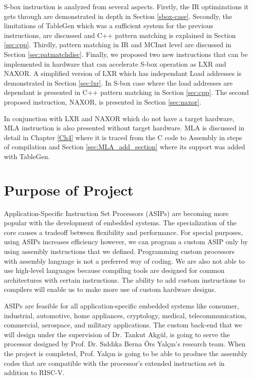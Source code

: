 S-box instruction is analyzed from several aspects. Firstly, the IR optimizations it gets through are demonstrated in depth in Section \ref{sbox-case}. Secondly, the limitations of TableGen which was a sufficient system for the previous instructions, are discussed and C++ pattern matching is explained in Section \ref{sec:cpp}. 
Thirdly, pattern matching in IR and MCInst level are discussed in Section \ref{sec:patmatchdisc}. Finally, we proposed two new instructions that can be implemented in hardware that can accelerate S-box operation as LXR and NAXOR. A simplified version of LXR which has independant Load addresses is demonstrated in Section \ref{sec:lxr}. In S-box case where the load addresses are dependant is presented in C++ pattern matching in Section \ref{sec:cpp}. The second proposed instruction, NAXOR, is presented in Section \ref{sec:naxor}.

In conjunction with LXR and NAXOR which do not have a target hardware, MLA instruction is also presented without target hardware. MLA is discussed in detail in Chapter \ref{Ch4} where it is traced from the C code to Assembly in steps of compilation and Section \ref{sec:MLA_add_section} where its support was added with TableGen. 


\section{Purpose of Project}
Application-Specific Instruction Set Processors (ASIPs) are becoming more popular with the development of embedded systems. The specialization of the core causes a tradeoff between flexibility and performance. For special purposes, using ASIPs increases efficiency however, we can program a custom ASIP only by using assembly instructions that we defined. Programming custom processors with assembly language is not a preferred way of coding. We are also not able to use high-level languages because compiling tools are designed for common architectures with certain instructions. The ability to add custom instructions to compilers will enable us to make more use of custom hardware designs.

ASIPs are feasible for all application-specific embedded systems like consumer, industrial, automotive, home appliances, cryptology, medical, telecommunication, commercial, aerospace, and military applications. The custom back-end that we will design under the supervision of Dr. Tankut Akgül, is going to serve the processor designed by Prof. Dr. Sıddıka Berna Örs Yalçın’s research team. When the project is completed, Prof. Yalçın is going to be able to produce the assembly codes that are compatible with the processor’s extended instruction set in addition to RISC-V.

